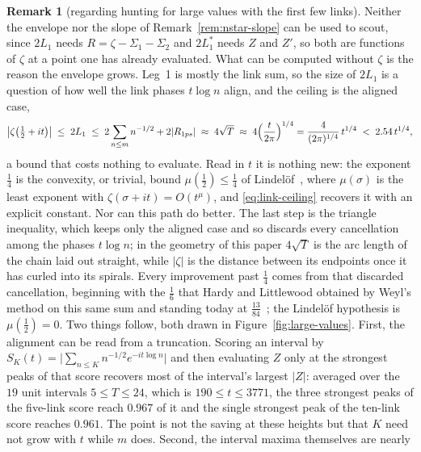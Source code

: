 \documentclass[11pt]{article}
\theoremstyle{definition}
\newtheorem{remark}[theorem]{Remark}
\begin{document}
\begin{remark}[regarding hunting for large values with the first few links]
\label{rem:large-values}
Neither the envelope nor the slope of Remark~\ref{rem:nstar-slope} can be used to
scout, since $2L_1$ needs $R=\zeta-\Sigma_1-\Sigma_2$ and $2L_1^{\ast}$ needs $Z$
and $Z'$, so both are functions of $\zeta$ at a point one has already evaluated.
What can be computed without $\zeta$ is the reason the envelope grows. Leg~1 is
mostly the link sum, so
the size of $2L_1$ is a question of how well the link phases $t\log n$ align, and
the ceiling is the aligned case,
\begin{equation}\label{eq:link-ceiling}
\bigl|\zeta\bigl(\tfrac12+it\bigr)\bigr|\;\leq\;2L_1\;\leq\;
2\sum_{n\leq m}n^{-1/2}+2|R_{1ps}|\;\approx\;4\sqrt{T}
\;\approx\;4\Bigl(\frac{t}{2\pi}\Bigr)^{1/4}
=\frac{4}{(2\pi)^{1/4}}\,t^{1/4}\;<\;2.54\,t^{1/4},
\end{equation}
a bound that costs nothing to evaluate. Read in $t$ it is nothing new: the
exponent $\tfrac14$ is the convexity, or trivial, bound $\mu(\tfrac12)\le\tfrac14$
of Lindel\"of~\cite{Lindelof1908}, where $\mu(\sigma)$ is the least exponent with
$\zeta(\sigma+it)=O(t^{\mu})$, and \eqref{eq:link-ceiling} recovers it with an
explicit constant. Nor can this path do better. The last step is the triangle
inequality, which keeps only the aligned case and so discards every cancellation
among the phases $t\log n$; in the geometry of this paper $4\sqrt T$ is the arc
length of the chain laid out straight, while $|\zeta|$ is the distance between its
endpoints once it has curled into its spirals. Every improvement past $\tfrac14$
comes from that discarded cancellation, beginning with the $\tfrac16$ that Hardy
and Littlewood obtained by Weyl's method on this same sum and standing today at
$\tfrac{13}{84}$~\cite{Bourgain2017}; the Lindel\"of hypothesis is
$\mu(\tfrac12)=0$. Two things follow, both drawn in
Figure~\ref{fig:large-values}. First, the alignment can be read from a
truncation. Scoring an interval by
$S_K(t)=\bigl|\sum_{n\leq K}n^{-1/2}e^{-it\log n}\bigr|$ and then evaluating $Z$
only at the strongest peaks of that score recovers most of the interval's largest
$|Z|$: averaged over the $19$ unit intervals $5\leq T\leq24$, which is
$190\leq t\leq3771$, the three strongest peaks of the five-link score reach
$0.967$ of it and the single strongest peak of the ten-link score reaches
$0.961$. The point is not the saving at these heights but that $K$ need not grow
with $t$ while $m$ does. Second, the interval maxima themselves are nearly

\end{remark}
\end{document}
